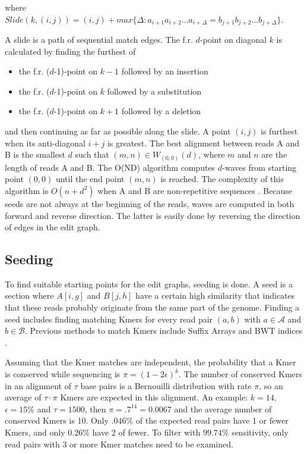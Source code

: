 \documentclass[../thesis.tex]{subfiles}
\begin{document}
where $Slide(k,(i,j)) = (i,j) + max\{\Delta:a_{i+1}a_{i+2}...a_{i+\Delta} = b_{j+1}b_{j+2}...b_{j+\Delta}\}$.

A slide is a path of sequential match edges.
The f.r. $d$-point on diagonal $k$ is calculated by finding the furthest of
\begin{itemize}
\item the f.r. ($d$-1)-point on $k-1$ followed by an insertion
\item the f.r. ($d$-1)-point on $k$ followed by a substitution
\item the f.r. ($d$-1)-point on $k+1$ followed by a deletion
\end{itemize}
and then continuing as far as possible along the slide.
A point $(i,j)$ is furthest when its anti-diagonal $i+j$ is greatest.
The best alignment between reads A and B is the smallest $d$ such that $(m,n)\in W_{(0,0)}(d)$, where $m$ and $n$ are the length of reads A and B.
The O(ND) algorithm computes $d$-waves from starting point $(0,0)$ until the end point $(m,n)$ is reached.
The complexity of this algorithm is $O(n+d^2)$ when A and B are non-repetitive sequences \cite{Daligner}.
Because seeds are not always at the beginning of the reads, waves are computed in both forward and reverse direction.
The latter is easily done by reversing the direction of edges in the edit graph.

\subsection{Seeding}
To find suitable starting points for the edit graphs, seeding is done.
A seed is a section where $A[i,g]$ and $B[j,h]$ have a certain high similarity that indicates that these reads probably originate from the same part of the genome.
Finding a seed includes finding matching Kmers for every read pair $(a,b)$ with $a\in \mathcal{A}$ and $b\in \mathcal{B}$.
Previous methods to match Kmers include Suffix Arrays \cite{SA} and BWT indices \cite{BWT}.

Assuming that the Kmer matches are independent, the probability that a Kmer is conserved while sequencing is $\pi = (1-2\epsilon)^k$.
The number of conserved Kmers in an alignment of $\tau$ base pairs is a Bernouilli distribution with rate $\pi$, so an average of $\tau\cdot\pi$ Kmers are expected in this alignment.
An example: $k=14$, $\epsilon=15\%$ and $\tau = 1500$, then $\pi = .7^{14} = 0.0067$ and the average number of conserved Kmers is 10.
Only $.046\%$ of the expected read pairs have 1 or fewer Kmers, and only $0.26\%$ have 2 of fewer.
To filter with $99.74\%$ sensitivity, only read pairs with 3 or more Kmer matches need to be examined.
\end{document}
